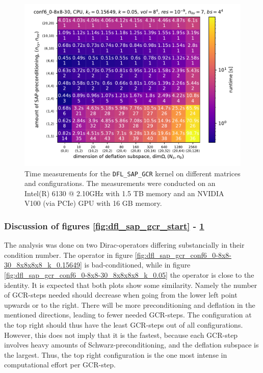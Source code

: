 \documentclass{article}
\theoremstyle{plain} %
\theoremstyle{convention} %
\theoremstyle{remark} %
\def\code#1{\texttt{#1}}
\numberwithin{equation}{section}
\begin{document}
\begin{figure}[h]
    \centering
    \includegraphics[width=1.0\textwidth]{plots/dfl_sap_gcr_conf6_0-8x8-30_8x8x8x8_k_0.05}
    \caption{Time measurements for the \code{DFL\_SAP\_GCR} kernel on different matrices and configurations. The measurements were conducted on an Intel(R) 6130 @ 2.10GHz with 1.5 TB memory and an NVIDIA V100 (via PCIe) GPU with 16 GB memory.}
    \label{fig:dfl_sap_gcr1}
    \label{fig:dfl_sap_gcr_conf6_0-8x8-30_8x8x8x8_k_0.05}
    \label{fig:dfl_sap_gcr_end}
\end{figure}

\subsubsection{Discussion of figures \ref{fig:dfl_sap_gcr_start} - \ref{fig:dfl_sap_gcr_end}}

The analysis was done on two Dirac-operators differing substancially in their condition number. The operator in figure \ref{fig:dfl_sap_gcr_conf6_0-8x8-30_8x8x8x8_k_0.15649} is bad-conditioned, while in figure \ref{fig:dfl_sap_gcr_conf6_0-8x8-30_8x8x8x8_k_0.05} the operator is close to the identity. It is expected that both plots show some similarity. Namely the number of GCR-steps needed should decrease when going from the lower left point upwards or to the right. There will be more preconditioning and deflation in the mentioned directions, leading to fewer needed GCR-steps. The configuration at the top right should thus have the least GCR-steps out of all configurations. However, this does not imply that it is the fastest, because each GCR-step involves heavy amounts of Schwarz-preconditioning, and the deflation subspace is the largest. Thus, the top right configuration is the one most intense in computational effort per GCR-step.
\end{document}

